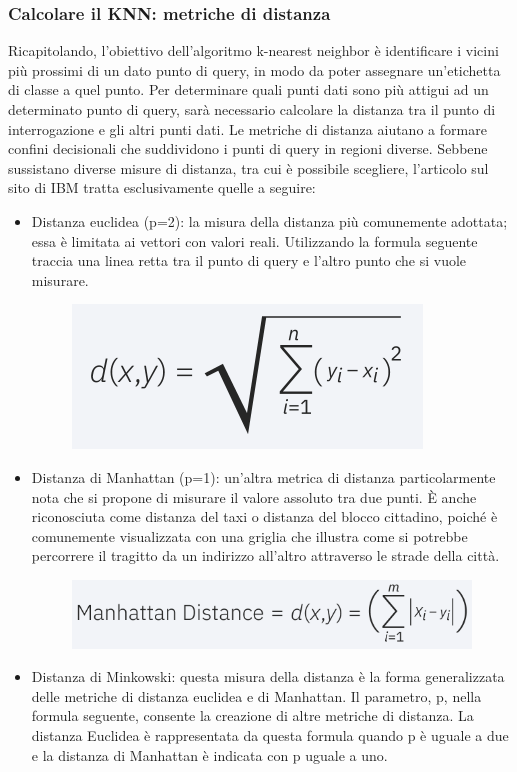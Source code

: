 \subsubsection{Calcolare il KNN: metriche di distanza}
Ricapitolando, l'obiettivo dell'algoritmo k-nearest neighbor è identificare i vicini più prossimi di un dato punto di query, in modo da poter assegnare un'etichetta di classe a quel punto. 
Per determinare quali punti dati sono più attigui ad un determinato punto di query, sarà necessario calcolare la distanza tra il punto di interrogazione e gli altri punti dati. 
Le metriche di distanza aiutano a formare confini decisionali che suddividono i punti di query in regioni diverse. 
Sebbene sussistano diverse misure di distanza, tra cui è possibile scegliere, l’articolo sul sito di IBM tratta esclusivamente quelle a seguire:
\begin{itemize}
    \item Distanza euclidea (p=2): la misura della distanza più comunemente adottata; essa è limitata ai vettori con valori reali. 
    Utilizzando la formula seguente traccia una linea retta tra il punto di query e l'altro punto che si vuole misurare.
    \begin{figure}
        \begin{center}    
            \includegraphics[width=0.45\linewidth]{images/image12.png}
        \end{center}
    \end{figure}
    \item Distanza di Manhattan (p=1): un'altra metrica di distanza particolarmente nota che si propone di misurare il valore assoluto tra due punti. 
    È anche riconosciuta come distanza del taxi o distanza del blocco cittadino, poiché è comunemente visualizzata con una griglia che illustra come si potrebbe percorrere il tragitto da un indirizzo all'altro attraverso le strade della città.
    \begin{figure}
        \begin{center}    
            \includegraphics[width=0.45\linewidth]{images/image13.png}
        \end{center}
    \end{figure}
    \item Distanza di Minkowski: questa misura della distanza è la forma generalizzata delle metriche di distanza euclidea e di Manhattan. Il parametro, p, nella formula seguente, consente la creazione di altre metriche di distanza.    
    La distanza Euclidea è rappresentata da questa formula quando p è uguale a due e la distanza di Manhattan è indicata con p uguale a uno.


\end{itemize}
